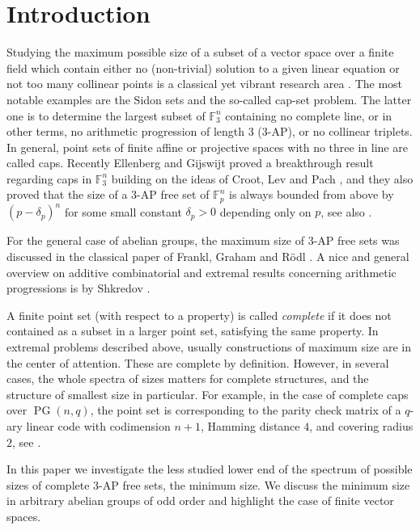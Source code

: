 \documentclass[11pt]{article}
\numberwithin{table}{section}
\newcommand{\F}{{\mathbb F}}
\theoremstyle{definition}
\DeclareMathOperator{\PG}{{PG}}
\begin{document}
	
	
	
	\section{Introduction}
	
	
	Studying the maximum possible size of a subset of a vector space  over a finite field which contain either no (non-trivial) solution to a given linear equation or not too many collinear points is a classical yet vibrant research area \cite{Alon, Bruyn,Eber, EG, KovacsNagy, FGR, Mimura, Lisa, Ilja}.
	The most notable examples are the Sidon sets and the so-called cap-set problem. The latter one is to determine the largest subset of $\F_3^n$ containing no complete line, or in other terms, no arithmetic progression of length 3 ($3$-$\mathrm{AP}$), or no collinear triplets. In general,  point sets of finite affine or projective spaces with no three in line are called caps. Recently Ellenberg and Gijswijt proved a breakthrough result regarding caps in $\F_3^n$ \cite{EG} building on the ideas of Croot, Lev and Pach \cite{CLP}, and they also proved that the size of a 
	$3$-$\mathrm{AP}$ free set of $\F_p^n$ is always bounded from above by $(p-\delta_p)^n$ for some small constant $\delta_p>0$ depending only on $p$, see also \cite{EPPP}.%
	
	For the general case of abelian groups,  the maximum size of $3$-$\mathrm{AP}$ free sets  was discussed in the classical paper of Frankl, Graham and Rödl \cite{FGR}.   A nice and general overview on additive combinatorial and extremal results concerning arithmetic progressions is by Shkredov \cite{Ilja}.
	
	A finite point set (with respect to a property)  is called  \textit{complete} if it does not contained as a subset in a larger point set, satisfying the same property.
	In extremal problems described above, usually constructions of maximum size are in the center of attention. These are complete by definition.  However, in several cases, the whole spectra of sizes matters for complete structures, and the structure of smallest size in particular. For example, in the case of complete caps over $\PG(n,q)$, the point set is corresponding to the parity check matrix of a $q$-ary linear code with codimension $n+1$,
	Hamming distance $4$, and covering radius $2$, see \cite{Hirs}. 
	
	In this paper we investigate the less studied lower end of the spectrum of possible sizes of complete $3$-$\mathrm{AP}$ free sets, the minimum size. We discuss the minimum size in arbitrary abelian groups of odd order and highlight the case of finite vector spaces.
	
\end{document}
